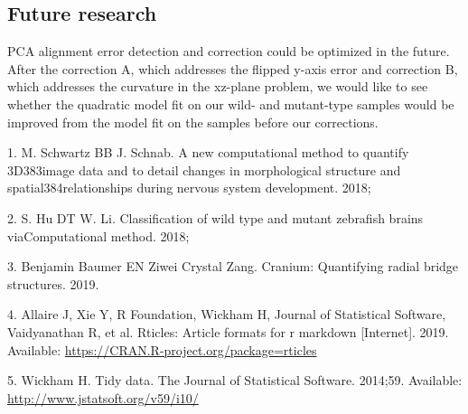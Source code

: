 \documentclass[10pt,letterpaper]{article}
\begin{document}
\hypertarget{future-research}{%
\subsection{Future research}\label{future-research}}

PCA alignment error detection and correction could be optimized in the
future. After the correction A, which addresses the flipped y-axis error
and correction B, which addresses the curvature in the xz-plane problem,
we would like to see whether the quadratic model fit on our wild- and
mutant-type samples would be improved from the model fit on the samples
before our corrections.

\hypertarget{refs}{}
\leavevmode\hypertarget{ref-Schwartz18}{}%
1. M. Schwartz BB J. Schnab. A new computational method to quantify
3D383image data and to detail changes in morphological structure and
spatial384relationships during nervous system development. 2018;

\leavevmode\hypertarget{ref-Hu18}{}%
2. S. Hu DT W. Li. Classification of wild type and mutant zebrafish
brains viaComputational method. 2018;

\leavevmode\hypertarget{ref-cranium}{}%
3. Benjamin Baumer EN Ziwei Crystal Zang. Cranium: Quantifying radial
bridge structures. 2019.

\leavevmode\hypertarget{ref-rticles19}{}%
4. Allaire J, Xie Y, R Foundation, Wickham H, Journal of Statistical
Software, Vaidyanathan R, et al. Rticles: Article formats for r markdown
{[}Internet{]}. 2019. Available:
\url{https://CRAN.R-project.org/package=rticles}

\leavevmode\hypertarget{ref-tidy-data}{}%
5. Wickham H. Tidy data. The Journal of Statistical Software. 2014;59.
Available: \url{http://www.jstatsoft.org/v59/i10/}

\nolinenumbers
\end{document}
